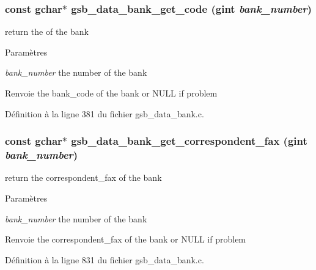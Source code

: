 \subsubsection[{gsb\_\-data\_\-bank\_\-get\_\-code}]{\setlength{\rightskip}{0pt plus 5cm}const gchar$\ast$ gsb\_\-data\_\-bank\_\-get\_\-code (gint {\em bank\_\-number})}\label{gsb__data__bank_8h_a13a589498f9c111fae65c5fd5cb8b322}
return the of the bank


\begin{DoxyParams}{Paramètres}
\item[{\em bank\_\-number}]the number of the bank\end{DoxyParams}
\begin{DoxyReturn}{Renvoie}
the bank\_\-code of the bank or NULL if problem 
\end{DoxyReturn}


Définition à la ligne 381 du fichier gsb\_\-data\_\-bank.c.

\subsubsection[{gsb\_\-data\_\-bank\_\-get\_\-correspondent\_\-fax}]{\setlength{\rightskip}{0pt plus 5cm}const gchar$\ast$ gsb\_\-data\_\-bank\_\-get\_\-correspondent\_\-fax (gint {\em bank\_\-number})}\label{gsb__data__bank_8h_a797e13d2d47e9679d3994a0b84b2f6bf}
return the correspondent\_\-fax of the bank


\begin{DoxyParams}{Paramètres}
\item[{\em bank\_\-number}]the number of the bank\end{DoxyParams}
\begin{DoxyReturn}{Renvoie}
the correspondent\_\-fax of the bank or NULL if problem 
\end{DoxyReturn}


Définition à la ligne 831 du fichier gsb\_\-data\_\-bank.c.

